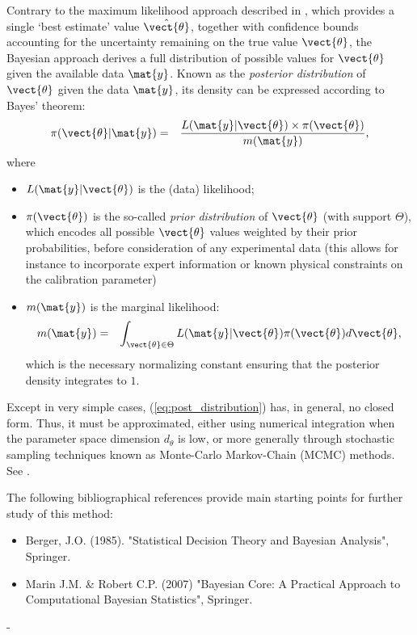 {  Contrary to the maximum likelihood approach described in ,
  which provides a single `best estimate' value $\hat{\vect{\theta}}$, together with confidence bounds accounting for the uncertainty
  remaining on the true value $\vect{\theta}$, the Bayesian approach derives a full distribution of possible values for $\vect{\theta}$
  given the available data $\mat{y}$. Known as the {\em posterior distribution} of $\vect{\theta}$ given the data $\mat{y}$,
  its density can be expressed according
  to Bayes' theorem:
  \begin{align}\label{eq:post_distribution}
    \pi(\vect{\theta} | \mat{y}) &=& \frac{L(\mat{y} | \vect{\theta}) \times \pi(\vect{\theta})}{m(\mat{y})},
  \end{align}
  where
  \begin{itemize}
  \item $L(\mat{y} | \vect{\theta})$ is the (data) likelihood;
  \item $\pi(\vect{\theta})$ is the so-called {\em prior distribution} of $\vect{\theta}$ (with support $\Theta$),
    which encodes all possible $\vect{\theta}$ values weighted by their prior probabilities, before consideration of any experimental data
    (this allows for instance to incorporate expert information or known physical constraints on the calibration parameter)
  \item $m(\mat{y})$ is the marginal likelihood:
    \begin{align*}
      m(\mat{y}) &=& \displaystyle\int_{\vect{\theta}\in\Theta} L(\mat{y} | \vect{\theta}) \pi(\vect{\theta}) d\vect{\theta},
    \end{align*}
    which is the necessary normalizing constant ensuring that the posterior density integrates to $1$.
  \end{itemize}

  Except in very simple cases, (\ref{eq:post_distribution}) has, in general, no closed form. Thus, it must be approximated, either using numerical integration when the parameter space dimension $d_\theta$ is low,
  or more generally through stochastic sampling techniques known as Monte-Carlo Markov-Chain (MCMC) methods.
  See .

  The following bibliographical references provide main starting points for further study of  this method:
  \begin{itemize}
  \item Berger, J.O. (1985). "Statistical Decision Theory and Bayesian Analysis", Springer.
  \item Marin J.M. \& Robert C.P. (2007) "Bayesian Core: A Practical Approach to Computational Bayesian Statistics", Springer.
  \end{itemize}
}
{
-
}
